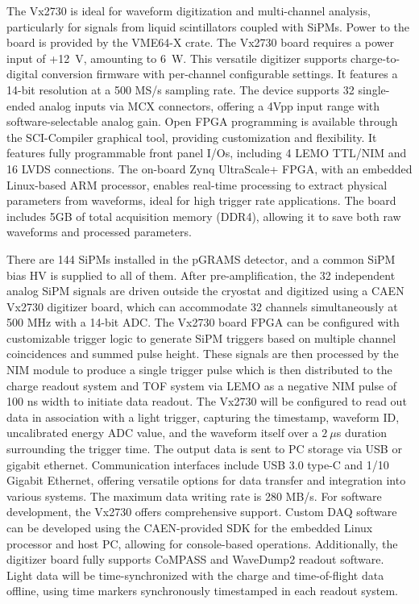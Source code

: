 The Vx2730 is ideal for waveform digitization and multi-channel analysis, particularly for signals from liquid scintillators coupled with SiPMs. 
Power to the board is provided by the VME64-X crate. The Vx2730 board requires a power input of +12~V, amounting to 6~W. This versatile digitizer supports charge-to-digital conversion firmware with per-channel configurable settings. It features a 14-bit resolution at a 500 MS/s sampling rate. The device supports 32 single-ended analog inputs via MCX connectors, offering a 4Vpp input range with software-selectable analog gain. Open FPGA programming is available through the SCI-Compiler graphical tool, providing customization and flexibility. It features fully programmable front panel I/Os, including 4 LEMO TTL/NIM and 16 LVDS connections. The on-board Zynq UltraScale+ FPGA, with an embedded Linux-based ARM processor, enables real-time processing to extract physical parameters from waveforms, ideal for high trigger rate applications. The board includes 5GB of total acquisition memory (DDR4), allowing it to save both raw waveforms and processed parameters.

There are 144 SiPMs installed in the pGRAMS detector, and a common SiPM bias HV is supplied to all of them. After pre-amplification, the 32 independent analog SiPM signals are driven outside the cryostat and digitized using a CAEN Vx2730 digitizer board, which can accommodate 32 channels simultaneously at 500 MHz with a 14-bit ADC. The Vx2730 board FPGA can be configured with customizable trigger logic to generate SiPM triggers based on multiple channel coincidences and summed pulse height. These signals are then processed by the NIM module to produce a single trigger pulse which is then distributed to the charge readout system and TOF system via LEMO as a negative NIM pulse of 100 ns width to initiate data readout. The Vx2730 will be configured to read out data in association with a light trigger, capturing the timestamp, waveform ID, uncalibrated energy ADC value, and the waveform itself over a $2~\mu$s duration surrounding the trigger time. The output data is sent to PC storage via USB or gigabit ethernet. Communication interfaces include USB 3.0 type-C and 1/10 Gigabit Ethernet, offering versatile options for data transfer and integration into various systems. The maximum data writing rate is 280 MB/s. For software development, the Vx2730 offers comprehensive support. Custom DAQ software can be developed using the CAEN-provided SDK for the embedded Linux processor and host PC, allowing for console-based operations. Additionally, the digitizer board fully supports CoMPASS and WaveDump2 readout software. Light data will be time-synchronized with the charge and time-of-flight data offline, using time markers synchronously timestamped in each readout system.

